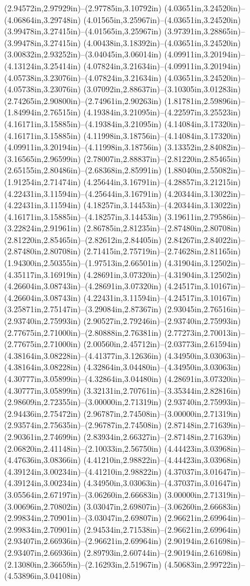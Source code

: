 (2.94572in,2.97929in)--(2.97785in,3.10792in) (4.03651in,3.24520in)--(4.06864in,3.29748in) (4.01565in,3.25967in)--(4.03651in,3.24520in) (3.99478in,3.27415in)--(4.01565in,3.25967in) (3.97391in,3.28865in)--(3.99478in,3.27415in) (4.00438in,3.18392in)--(4.03651in,3.24520in) (3.00832in,2.93252in)--(3.04045in,3.06014in) (4.09911in,3.20194in)--(4.13124in,3.25414in) (4.07824in,3.21634in)--(4.09911in,3.20194in) (4.05738in,3.23076in)--(4.07824in,3.21634in) (4.03651in,3.24520in)--(4.05738in,3.23076in) (3.07092in,2.88637in)--(3.10305in,3.01283in) (2.74265in,2.90800in)--(2.74961in,2.90263in) (1.81781in,2.59896in)--(1.84994in,2.76515in) (4.19384in,3.21095in)--(4.22597in,3.25523in) (4.16171in,3.15885in)--(4.19384in,3.21095in) (4.14084in,3.17320in)--(4.16171in,3.15885in) (4.11998in,3.18756in)--(4.14084in,3.17320in) (4.09911in,3.20194in)--(4.11998in,3.18756in) (3.13352in,2.84082in)--(3.16565in,2.96599in) (2.78007in,2.88837in)--(2.81220in,2.85465in) (2.65155in,2.80486in)--(2.68368in,2.85991in) (1.88040in,2.55082in)--(1.91254in,2.71474in) (4.25644in,3.16791in)--(4.28857in,3.21215in) (4.22431in,3.11594in)--(4.25644in,3.16791in) (4.20344in,3.13022in)--(4.22431in,3.11594in) (4.18257in,3.14453in)--(4.20344in,3.13022in) (4.16171in,3.15885in)--(4.18257in,3.14453in) (3.19611in,2.79586in)--(3.22824in,2.91961in) (2.86785in,2.81235in)--(2.87480in,2.80708in) (2.81220in,2.85465in)--(2.82612in,2.84405in) (2.84267in,2.84022in)--(2.87480in,2.80708in) (2.71415in,2.75719in)--(2.74628in,2.81165in) (1.94300in,2.50355in)--(1.97513in,2.66501in) (4.31904in,3.12502in)--(4.35117in,3.16919in) (4.28691in,3.07320in)--(4.31904in,3.12502in) (4.26604in,3.08743in)--(4.28691in,3.07320in) (4.24517in,3.10167in)--(4.26604in,3.08743in) (4.22431in,3.11594in)--(4.24517in,3.10167in) (3.25871in,2.75147in)--(3.29084in,2.87367in) (2.93045in,2.76516in)--(2.93740in,2.75993in) (2.90527in,2.79246in)--(2.93740in,2.75993in) (2.77675in,2.71000in)--(2.80888in,2.76381in) (2.77273in,2.70013in)--(2.77675in,2.71000in) (2.00560in,2.45712in)--(2.03773in,2.61594in) (4.38164in,3.08228in)--(4.41377in,3.12636in) (4.34950in,3.03063in)--(4.38164in,3.08228in) (4.32864in,3.04480in)--(4.34950in,3.03063in) (4.30777in,3.05899in)--(4.32864in,3.04480in) (4.28691in,3.07320in)--(4.30777in,3.05899in) (3.32131in,2.70761in)--(3.35344in,2.82816in) (2.98609in,2.72355in)--(3.00000in,2.71319in) (2.93740in,2.75993in)--(2.94436in,2.75472in) (2.96787in,2.74508in)--(3.00000in,2.71319in) (2.93574in,2.75635in)--(2.96787in,2.74508in) (2.87148in,2.71639in)--(2.90361in,2.74699in) (2.83934in,2.66327in)--(2.87148in,2.71639in) (2.06820in,2.41148in)--(2.10033in,2.56750in) (4.44423in,3.03968in)--(4.47636in,3.08366in) (4.41210in,2.98822in)--(4.44423in,3.03968in) (4.39124in,3.00234in)--(4.41210in,2.98822in) (4.37037in,3.01647in)--(4.39124in,3.00234in) (4.34950in,3.03063in)--(4.37037in,3.01647in) (3.05564in,2.67197in)--(3.06260in,2.66683in) (3.00000in,2.71319in)--(3.00696in,2.70802in) (3.03047in,2.69807in)--(3.06260in,2.66683in) (2.99834in,2.70901in)--(3.03047in,2.69807in) (2.96621in,2.69964in)--(2.99834in,2.70901in) (2.94534in,2.71538in)--(2.96621in,2.69964in) (2.93407in,2.66936in)--(2.96621in,2.69964in) (2.90194in,2.61698in)--(2.93407in,2.66936in) (2.89793in,2.60744in)--(2.90194in,2.61698in) (2.13080in,2.36659in)--(2.16293in,2.51967in) (4.50683in,2.99722in)--(4.53896in,3.04108in) 